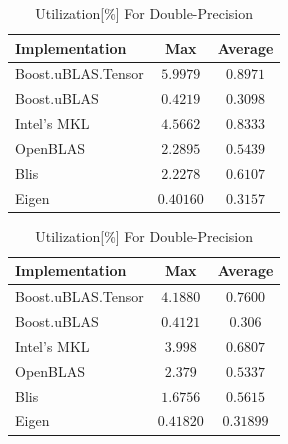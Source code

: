 \begin{table}[ht]
    \centering
    \caption{Utilization[\%] For Single-Precision}
    \begin{tabular}{|l|c|c|}
        \hline
        \textbf{Implementation} & \textbf{Max} & \textbf{Average}\\
        \hline
        Boost.uBLAS.Tensor  & $5.9979$ & $0.8971$ \\
        \hline
        Boost.uBLAS         & $0.4219$ & $0.3098$ \\
        \hline
        Intel's MKL         & $4.5662$ & $0.8333$ \\
        \hline
        OpenBLAS            & $2.2895$ & $0.5439$ \\
        \hline
        Blis                & $2.2278$ & $0.6107$ \\
        \hline
        Eigen               & $0.40160$ & $0.3157$ \\
        \hline
    \end{tabular}

    \vspace*{1 cm}

    \centering
    \caption{Utilization[\%] For Double-Precision}
    \begin{tabular}{|l|c|c|}
        \hline
        \textbf{Implementation} & \textbf{Max} & \textbf{Average}\\
        \hline
        Boost.uBLAS.Tensor  & $4.1880$ & $0.7600$ \\
        \hline
        Boost.uBLAS         & $0.4121$ & $0.306$ \\
        \hline
        Intel's MKL         & $3.998$ & $0.6807$ \\
        \hline
        OpenBLAS            & $2.379$ & $0.5337$ \\
        \hline
        Blis                & $1.6756$ & $0.5615$ \\
        \hline
        Eigen               & $0.41820$ & $0.31899$ \\
        \hline
    \end{tabular}
\end{table}

